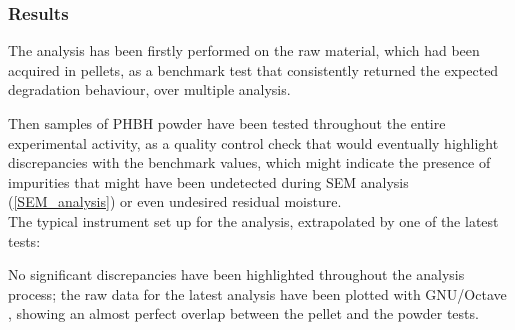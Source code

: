 \documentclass{article}
\begin{document}
            \subsubsection{Results}

            The analysis has been firstly performed on the raw material, which had been acquired in pellets, as a benchmark test
            that consistently returned the expected degradation behaviour, over multiple analysis. 

            Then samples of PHBH powder have been tested throughout the entire experimental activity, as a quality control check that 
            would eventually highlight discrepancies with the benchmark values, which might indicate the presence of impurities
            that might have been undetected during SEM analysis (\ref{SEM_analysis}) or even undesired residual moisture. \\ 

            The typical instrument set up for the analysis, extrapolated by one of the latest tests: 


                \begin{table}[h!]
                    \centering
                    \label{tab:TGA_instrument_parameters}
                    \end{table}

            No significant discrepancies have been highlighted throughout the analysis process; the raw data for the latest analysis have been plotted with GNU/Octave \autocite{Octave}, showing an almost perfect overlap between the pellet 
            and the powder tests. 
\end{document}
